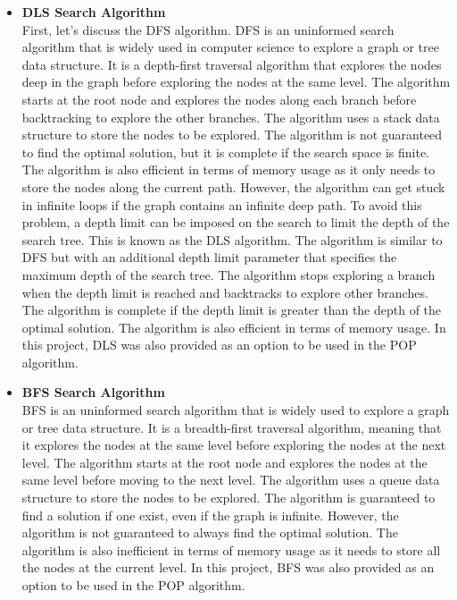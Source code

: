 \begin{itemize}
    \item \textbf{\acf{DLS} Search Algorithm} \label{subsubsec:dls}\\
          First, let's discuss the \ac{DFS} algorithm.
          \ac{DFS} is an uninformed search algorithm that is widely used in computer science to explore a graph or tree data structure. It is a depth-first traversal algorithm that explores the nodes deep in the graph before exploring the nodes at the same level. The algorithm starts at the root node and explores the nodes along each branch before backtracking to explore the other branches. The algorithm uses a stack data structure to store the nodes to be explored. The algorithm is not guaranteed to find the optimal solution, but it is complete if the search space is finite. The algorithm is also efficient in terms of memory usage as it only needs to store the nodes along the current path. However, the algorithm can get stuck in infinite loops if the graph contains an infinite deep path. To avoid this problem, a depth limit can be imposed on the search to limit the depth of the search tree. This is known as the \acf{DLS} algorithm. The algorithm is similar to \ac{DFS} but with an additional depth limit parameter that specifies the maximum depth of the search tree. The algorithm stops exploring a branch when the depth limit is reached and backtracks to explore other branches. The algorithm is complete if the depth limit is greater than the depth of the optimal solution. The algorithm is also efficient in terms of memory usage. In this project, \ac{DLS} was also provided as an option to be used in the \ac{POP} algorithm.

    \item \textbf{\acf{BFS} Search Algorithm} \label{subsubsec:bfs}\\
          \ac{BFS} is an uninformed search algorithm that is widely used to explore a graph or tree data structure. It is a breadth-first traversal algorithm, meaning that it explores the nodes at the same level before exploring the nodes at the next level. The algorithm starts at the root node and explores the nodes at the same level before moving to the next level. The algorithm uses a queue data structure to store the nodes to be explored. The algorithm is guaranteed to find a solution if one exist, even if the graph is infinite. However, the algorithm is not guaranteed to always find the optimal solution. The algorithm is also inefficient in terms of memory usage as it needs to store all the nodes at the current level. In this project, \ac{BFS} was also provided as an option to be used in the \ac{POP} algorithm.


\end{itemize}
